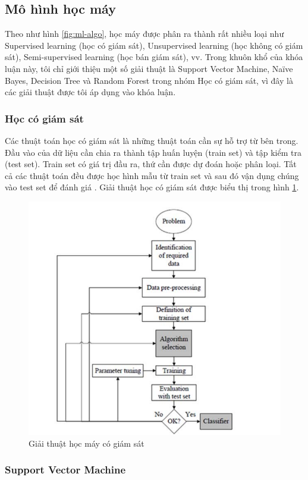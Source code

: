 \subsection{Mô hình học máy}

Theo như hình \ref{fig:ml-algo}, học máy được phân ra thành rất nhiều loại như Supervised learning (học có giám sát), Unsupervised learning (học không có giám sát), Semi-supervised learning (học bán giám sát), vv. Trong khuôn khổ của khóa luận này, tôi chỉ giới thiệu một số giải thuật là Support Vector Machine, Naïve Bayes, Decision Tree và Random Forest trong nhóm Học có giám sát, vì đây là các giải thuật được tôi áp dụng vào khóa luận.

\subsubsection{Học có giám sát}

Các thuật toán học có giám sát là những thuật toán cần sự hỗ trợ từ bên trong. Đầu vào của dữ liệu cần chia ra thành tập huấn luyện (train set) và tập kiểm tra (test set). Train set có giá trị đầu ra, thứ cần được dự đoán hoặc phân loại. Tất cả các thuật toán đều được học hình mẫu từ train set và sau đó vận dụng chúng vào test set để đánh giá \cite{21-Kotsiantis}. Giải thuật học có giám sát được biểu thị trong hình \ref{fig:supervised-ml}.

\begin{figure}[ht!]
	\centering
	\includegraphics[width=0.6\linewidth]{fig/supervised-ml.png}
	\caption{Giải thuật học máy có giám sát \cite{18-Dey}}
	\label{fig:supervised-ml}
\end{figure} 

\subsubsection{Support Vector Machine}

